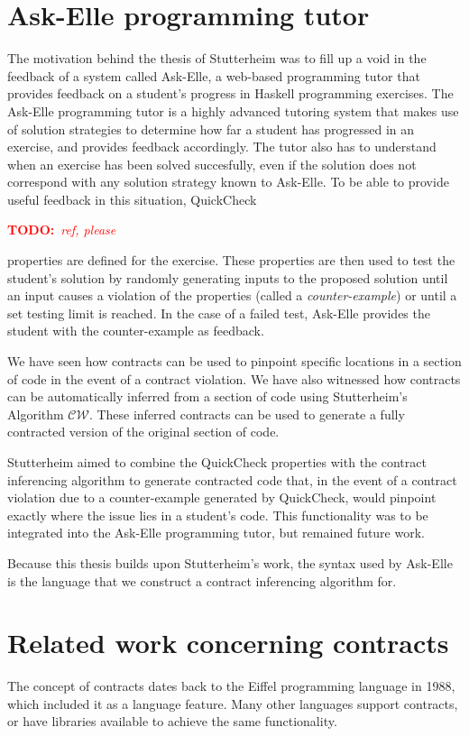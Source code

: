 \documentclass[10pt]{report}
\newcommand{\CW}{$\mathcal{CW}$}
\newcommand{\annotate}[3]{
	\begin{scriptsize}
	\textcolor{#1}{\textbf{#2}~\textit{#3}}
	\end{scriptsize}\newline}
\newcommand{\todo}[1]{\annotate{red} {TODO:} {#1}}
\begin{document}
\section{Ask-Elle programming tutor}
The motivation behind the thesis of Stutterheim was to fill up a void in the feedback of a system called Ask-Elle, a web-based programming tutor that provides feedback on a student's progress in Haskell programming exercises.
The Ask-Elle programming tutor is a highly advanced tutoring system that makes use of solution strategies to determine how far a student has progressed in an exercise, and provides feedback accordingly.
The tutor also has to understand when an exercise has been solved succesfully, even if the solution does not correspond with any solution strategy known to Ask-Elle.
To be able to provide useful feedback in this situation, QuickCheck \todo{ref, please} properties are defined for the exercise.
These properties are then used to test the student's solution by randomly generating inputs to the proposed solution until an input causes a violation of the properties (called a \textit{counter-example}) or until a set testing limit is reached.
In the case of a failed test, Ask-Elle provides the student with the counter-example as feedback.

We have seen how contracts can be used to pinpoint specific locations in a section of code in the event of a contract violation.
We have also witnessed how contracts can be automatically inferred from a section of code using Stutterheim's Algorithm \CW.
These inferred contracts can be used to generate a fully contracted version of the original section of code.

Stutterheim aimed to combine the QuickCheck properties with the contract inferencing algorithm to generate contracted code that, in the event of a contract violation due to a counter-example generated by QuickCheck, would pinpoint exactly where the issue lies in a student's code.
This functionality was to be integrated into the Ask-Elle programming tutor, but remained future work.

Because this thesis builds upon Stutterheim's work, the syntax used by Ask-Elle is the language that we construct a contract inferencing algorithm for.

\section{Related work concerning contracts}
\label{section:relatedworkcontracts}
The concept of contracts dates back to the Eiffel programming language \cite{Meyer:1988wp} in 1988, which included it as a language feature.
Many other languages support contracts, or have libraries available to achieve the same functionality.
\end{document}
